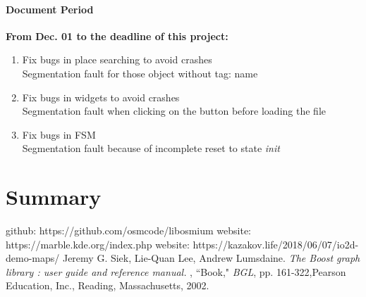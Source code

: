 \documentclass[a4paper, 12pt, english]{book}
\begin{document}
\subsubsection{Document Period}

{\textbf{From Dec. 01 to the deadline of this project:}}
\begin{enumerate}
	\item Fix bugs in place searching to avoid crashes\\
	Segmentation fault for those object without tag: name
	\item Fix bugs in widgets to avoid crashes\\
	Segmentation fault when clicking on the button before loading the file
	\item Fix bugs in FSM\\
	Segmentation fault because of incomplete reset to state {\textit{init}}
\end{enumerate}










\chapter{Summary}



\begin{thebibliography}{12}
github: https://github.com/osmcode/libosmium
website: https://marble.kde.org/index.php
website: https://kazakov.life/2018/06/07/io2d-demo-maps/
Jeremy G. Siek,
Lie-Quan Lee, Andrew Lumsdaine.
\textit{The Boost graph library : user guide and reference manual.} , ``Book," \emph{BGL}, pp. 161-322,Pearson Education, Inc., Reading, Massachusetts, 2002.
\end{thebibliography}
\end{document}
